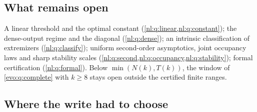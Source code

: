 \documentclass[11pt,a4paper]{article}
\numberwithin{equation}{section}
\theoremstyle{definition}
\theoremstyle{remark}
\begin{document}
\subsection{What remains open}
A linear threshold and the optimal constant (\cref{nl:q:linear,nl:q:constant});
the dense-output regime and the diagonal (\cref{nl:q:dense}); an intrinsic
classification of extremizers (\cref{nl:q:classify}); uniform second-order
asymptotics, joint occupancy laws and sharp stability scales
(\cref{nl:q:second,nl:q:occupancy,nl:q:stability}); formal certification
(\cref{nl:q:formal}). Below $\min(N(k),T(k))$, the window of
\cref{evo:q:complete} with $k\ge8$ stays open outside the certified finite
ranges.

\subsection{Where the write had to choose}\label{nl:sec:merge}
\end{document}
